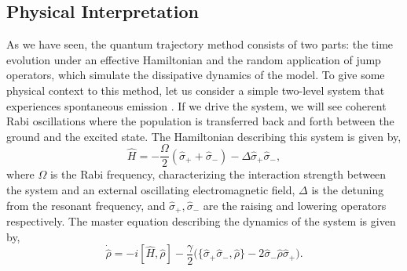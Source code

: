 \subsection{Physical Interpretation}

As we have seen, the quantum trajectory method consists of two parts: the time evolution under an effective Hamiltonian and the random application of jump operators, which simulate the dissipative dynamics of the model. To give some physical context to this method, let us consider a simple two-level system that experiences spontaneous emission \cite{cohen1992}. If we drive the system, we will see coherent Rabi oscillations where the population is transferred back and forth between the ground and the excited state. The Hamiltonian describing this system is given by,
\begin{equation}
    \hat{H} = - \frac{\Omega}{2} (\hat{\sigma}_+ + \hat{\sigma}_-) - \Delta \hat{\sigma}_+ \hat{\sigma}_-,
\end{equation}
where $\Omega$ is the Rabi frequency, characterizing the interaction strength between the system and an external oscillating electromagnetic field, $\Delta$ is the detuning from the resonant frequency, and $\hat{\sigma}_+, \hat{\sigma}_-$ are the raising and lowering operators respectively. The master equation describing the dynamics of the system is given by, 
\begin{equation}
    \dot{\hat{\rho}} = -i [\hat{H}, \hat{\rho}] - \frac{\gamma}{2} \big( \{ \hat{\sigma}_+ \hat{\sigma}_-, \hat{\rho} \} - 2 \hat{\sigma}_- \hat{\rho} \hat{\sigma}_+ \big). 
\end{equation}

